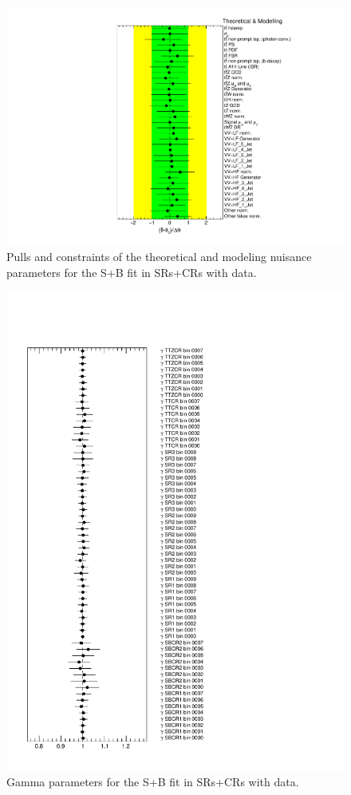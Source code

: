 \begin{figure}[htbp]
	\centering
	\includegraphics[width=.85\textwidth]{Chapters/CH8/figures/SPLUSB_CRSR_DL1rc_unblind/NuisPar_Theoretical_&_Modelling}
	\caption{Pulls and constraints of the theoretical and modeling nuisance parameters for the S+B \tZc fit in SRs+CRs with data.}%
	\label{fig:stat:tzc:splusb:crsr:np:model_unb}
\end{figure}

\begin{figure}[htbp]
	\centering
	\includegraphics[width=.85\textwidth]{Chapters/CH8/figures/SPLUSB_CRSR_DL1rc_unblind/Gammas}
	\caption{Gamma parameters for the S+B \tZc fit in SRs+CRs with data.}%
	\label{fig:stat:tzc:splusb:crsr:gamma_unb}
\end{figure}

